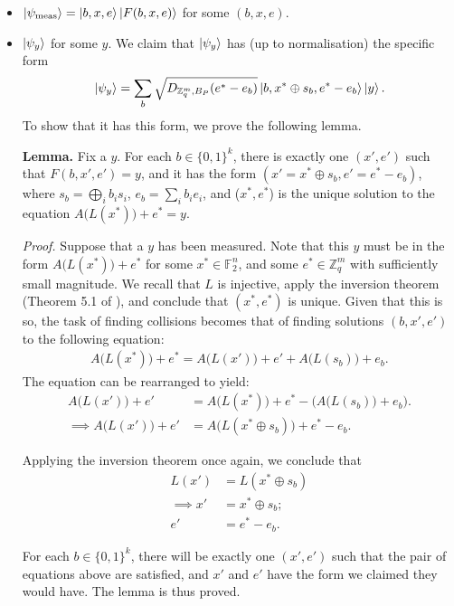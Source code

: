 \documentclass{article}
\begin{document}
\begin{itemize}
		\item $\ket{\psi_{\mathrm{meas}}} = \ket{b, x, e} \ket{F(b, x, e)}$ for some $(b, x, e)$.
     \item $\ket{\psi_y}$ for some $y$. We claim that $\ket{\psi_y}$ has (up to normalisation) the specific form 
		\begin{align}
			\ket{\psi_y} = \sum_b \sqrt{D_{\mathbb{Z}_q^m, B_P}(e^* - e_b)} \ket{b, x^* \oplus s_b, e^* - e_b} \ket{y}.
		\end{align}
		To show that it has this form, we prove the following lemma.
		
		\textbf{Lemma.} Fix a $y$. For each $b \in \{0,1\}^k$, there is exactly one $(x', e')$ such that $F(b, x', e') = y$, and it has the form $(x' = x^* \oplus s_b, e' = e^* - e_b)$, where $s_b = \bigoplus_i b_i s_i$, $e_b = \sum_i b_i e_i$, and ($x^*, e^*$) is the unique solution to the equation $A\big( L(x^*) \big) + e^* = y$.

		\textit{Proof.} Suppose that a $y$ has been measured. Note that this $y$ must be in the form $A\big( L(x^*) \big) + e^*$ for some $x^* \in \mathbb{F}_2^n$, and some $e^* \in \mathbb{Z}_q^m$ with sufficiently small magnitude. We recall that $L$ is injective, apply the inversion theorem (Theorem 5.1 of \cite{MP11}), and conclude that $(x^*, e^*)$ is unique. Given that this is so, the task of finding collisions becomes that of finding solutions $(b, x', e')$ to the following equation:
		\begin{align}
			A\big( L(x^*) \big) + e^* = A\big( L(x') \big) + e' + A\big( L(s_{b}) \big) + e_{b}.
		\end{align}
		The equation can be rearranged to yield:
		\begin{align}
			A\big( L(x') \big) + e' &= A\big( L(x^*) \big) + e^* - \Big( A\big( L(s_{b}) \big) + e_{b} \Big). \\
			\implies A\big( L(x') \big) + e' &= A\big( L(x^* \oplus s_{b}) \big) + e^* - e_{b}.
		\end{align}

		Applying the inversion theorem once again, we conclude that
		\begin{align}
			L(x') &= L(x^* \oplus s_{b}) \\
			\implies x' &= x^* \oplus s_{b}; \\
			e' &= e^* - e_{b}.
		\end{align}

		For each $b \in \{0,1\}^k$, there will be exactly one $(x', e')$ such that the pair of equations above are satisfied, and $x'$ and $e'$ have the form we claimed they would have. The lemma is thus proved.


\end{itemize}
\end{document}
